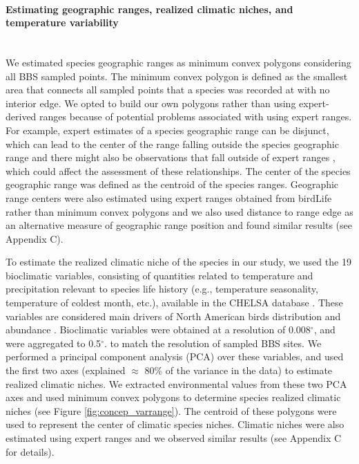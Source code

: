\paragraph*{Estimating geographic ranges, realized climatic niches, and temperature variability}\mbox{}\\ 
We estimated species geographic ranges as minimum convex polygons considering all BBS sampled points. The minimum convex polygon is defined as the smallest area that connects all sampled points that a species was recorded at with no interior edge. We opted to build our own polygons rather than using expert-derived ranges because of potential problems associated with using expert ranges. For example, expert estimates of a species geographic range can be disjunct, which can lead to the center of the range falling outside the species geographic range and there might also be observations that fall outside of expert ranges  \parencite{fristoe2023}, which could affect the assessment of these relationships. The center of the species geographic range was defined as the centroid of the species ranges. Geographic range centers were also estimated using expert ranges obtained from birdLife \parencite{birdlife} rather than minimum convex polygons and we also used distance to range edge as an alternative measure of geographic range position and found similar results (see Appendix C). 


To estimate the realized climatic niche of the species in our study, we used the 19 bioclimatic variables, consisting of quantities related to temperature and precipitation relevant to species life history (e.g., temperature seasonality, temperature of coldest month, etc.), available in the CHELSA database \parencite{karger2017}. These variables are considered main drivers of North American birds distribution and abundance \parencite{barbet2014, illan2014, huang2017}. Bioclimatic variables were obtained at a resolution of 0.008$^\circ$, and were aggregated to 0.5$^\circ$. to match the resolution of sampled BBS sites. We performed a principal component analysis (PCA) over these variables, and used the first two axes (explained $\approx$ 80\% of the variance in the data) to estimate realized climatic niches. We extracted environmental values from these two PCA axes and used minimum convex polygons to determine species realized climatic niches (see Figure \ref{fig:concep_varrange}). The centroid of these polygons were used to represent the center of climatic species niches. Climatic niches were also estimated using expert ranges and we observed similar results (see Appendix C for details).  

